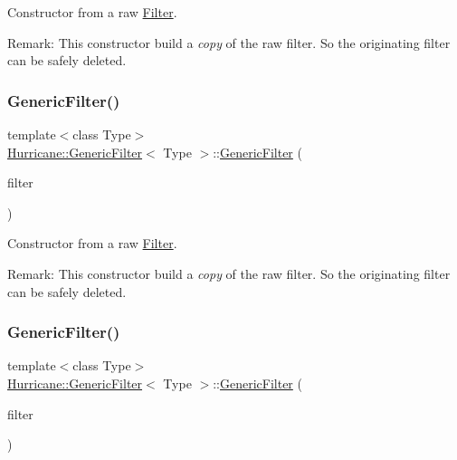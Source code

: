 Constructor from a raw \hyperlink{classHurricane_1_1Filter}{Filter}.

\begin{DoxyParagraph}{Remark\+:}
This constructor build a {\itshape copy} of the raw filter. So the originating filter can be safely deleted. 
\end{DoxyParagraph}
\mbox{\label{classHurricane_1_1GenericFilter_adf44866e7507f45dd0d612743f2d9a71}} 
\subsubsection{\texorpdfstring{Generic\+Filter()}{GenericFilter()}\hspace{0.1cm}{\footnotesize\ttfamily [2/3]}}
{\footnotesize\ttfamily template$<$class Type$>$ \\
\hyperlink{classHurricane_1_1GenericFilter}{Hurricane\+::\+Generic\+Filter}$<$ Type $>$\+::\hyperlink{classHurricane_1_1GenericFilter}{Generic\+Filter} (\begin{DoxyParamCaption}\item[{const \hyperlink{classHurricane_1_1GenericFilter}{Generic\+Filter}$<$ Type $>$ \&}]{filter }\end{DoxyParamCaption})\hspace{0.3cm}{\ttfamily [inline]}}

Constructor from a raw \hyperlink{classHurricane_1_1Filter}{Filter}.

\begin{DoxyParagraph}{Remark\+:}
This constructor build a {\itshape copy} of the raw filter. So the originating filter can be safely deleted. 
\end{DoxyParagraph}
\mbox{\label{classHurricane_1_1GenericFilter_aac847f0c0d6ee640c54847e374287fe1}} 
\subsubsection{\texorpdfstring{Generic\+Filter()}{GenericFilter()}\hspace{0.1cm}{\footnotesize\ttfamily [3/3]}}
{\footnotesize\ttfamily template$<$class Type$>$ \\
\hyperlink{classHurricane_1_1GenericFilter}{Hurricane\+::\+Generic\+Filter}$<$ Type $>$\+::\hyperlink{classHurricane_1_1GenericFilter}{Generic\+Filter} (\begin{DoxyParamCaption}\item[{\hyperlink{classHurricane_1_1Filter}{Filter}$<$ Type $>$ $\ast$}]{filter }\end{DoxyParamCaption})\hspace{0.3cm}{\ttfamily [inline]}}

